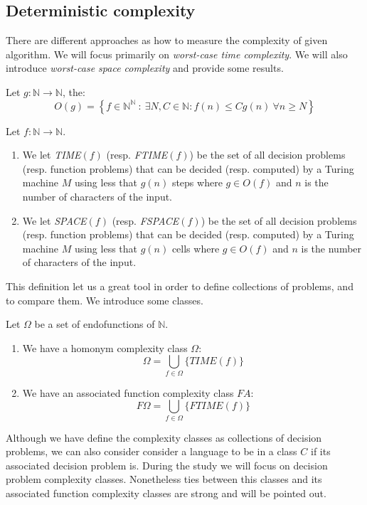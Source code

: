 \subsection{Deterministic complexity}
\label{sub:detcomp}
There are different approaches as how to measure the complexity of given algorithm. We will focus primarily on \emph{worst-case time complexity}. We will also introduce \emph{worst-case space complexity} and provide some results.

\begin{definition}
  Let $g:\mathbb{N}\to\mathbb{N}$, the:
  $$O(g) = \left\{ f \in \mathbb{N}^\mathbb{N}\ :\ \exists N,C \in \mathbb{N} : f(n) \le Cg(n) \ \forall  n \ge N\right\}$$
\end{definition}

\begin{definition}
  Let $f: \mathbb{N}\to  \mathbb{N}$.
\begin{enumerate}
  \item We let \emph{TIME}$(f)$ (resp. \emph{FTIME}$(f)$) be the set of all decision  problems (resp. function problems) that can be decided (resp. computed) by a Turing machine $M$ using less that $g(n)$ steps where $g\in O(f)$ and $n$ is the number of characters of the input.  
  \item We let \emph{SPACE}$(f)$ (resp. \emph{FSPACE}$(f)$) be the set of all decision problems (resp. function problems) that can be decided (resp. computed) by a Turing machine $M$ using less that $g(n)$ cells where $g\in O(f)$ and $n$ is the number of characters of the input.  
  \end{enumerate}

\end{definition}

This definition let us a great tool in order to define collections of problems, and to compare them. We introduce some classes.
\begin{definition}
  Let $\Omega$ be a set of endofunctions of $\mathbb{N}$.
  \begin{enumerate}
  \item We have a homonym complexity class $\Omega$:
  $$\Omega =  \bigcup_{f \in \Omega} \{ TIME(f)\} $$
  \item We have an associated function complexity class $FA$:
    $$F\Omega =  \bigcup_{f \in \Omega} \{ FTIME(f)\} $$
  \end{enumerate}
\end{definition}


Although we have define the complexity classes as collections of decision problems, we can also consider consider a language to be in a class $C$ if its associated decision problem is. During the study we will focus on decision problem complexity classes. Nonetheless ties between this classes and its associated function complexity classes are strong and will be pointed out.\\


